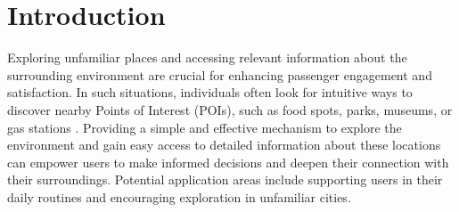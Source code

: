 \section{Introduction}

Exploring unfamiliar places and accessing relevant information about the surrounding environment are crucial for enhancing passenger engagement and satisfaction. In such situations, individuals often look for intuitive ways to discover nearby Points of Interest (POIs), such as food spots, parks, museums, or gas stations \cite{Psyllidis2022POIs, sun2023conflating}. Providing a simple and effective mechanism to explore the environment and gain easy access to detailed information about these locations can empower users to make informed decisions and deepen their connection with their surroundings. Potential application areas include supporting users in their daily routines and encouraging exploration in unfamiliar cities.


